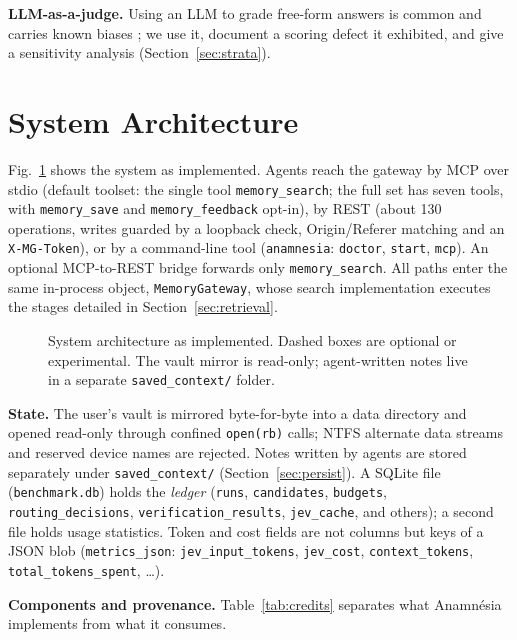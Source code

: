 \documentclass[conference,onecolumn,11pt]{IEEEtran}
\newcommand{\anam}{Anam\-n\'esia}
\begin{document}
\textbf{LLM-as-a-judge.} Using an LLM to grade free-form answers is common and carries known biases \cite{zheng2023judge}; we use it, document a scoring defect it exhibited, and give a sensitivity analysis (Section~\ref{sec:strata}).

\section{System Architecture}\label{sec:arch}
Fig.~\ref{fig:arch} shows the system as implemented. Agents reach the gateway by MCP over stdio (default toolset: the single tool \texttt{memory\_search}; the full set has seven tools, with \texttt{memory\_save} and \texttt{memory\_feedback} opt-in), by REST (about 130 operations, writes guarded by a loopback check, Origin/Referer matching and an \texttt{X-MG-Token}), or by a command-line tool (\texttt{anamnesia}: \texttt{doctor}, \texttt{start}, \texttt{mcp}). An optional MCP-to-REST bridge forwards only \texttt{memory\_search}. All paths enter the same in-process object, \texttt{MemoryGateway}, whose search implementation executes the stages detailed in Section~\ref{sec:retrieval}.

\begin{figure}[!htbp]\centering
{}
\caption{System architecture as implemented. Dashed boxes are optional or experimental. The vault mirror is read-only; agent-written notes live in a separate \texttt{saved\_context/} folder.}\label{fig:arch}
\end{figure}

\textbf{State.} The user's vault is mirrored byte-for-byte into a data directory and opened read-only through confined \texttt{open(rb)} calls; NTFS alternate data streams and reserved device names are rejected. Notes written by agents are stored separately under \texttt{saved\_context/} (Section~\ref{sec:persist}). A SQLite file (\texttt{benchmark.db}) holds the \emph{ledger} (\texttt{runs}, \texttt{candidates}, \texttt{budgets}, \texttt{routing\_decisions}, \texttt{verification\_results}, \texttt{jev\_cache}, and others); a second file holds usage statistics. Token and cost fields are not columns but keys of a JSON blob (\texttt{metrics\_json}: \texttt{jev\_input\_tokens}, \texttt{jev\_cost}, \texttt{context\_tokens}, \texttt{total\_tokens\_spent}, \dots).

\textbf{Components and provenance.} Table~\ref{tab:credits} separates what \anam{} implements from what it consumes.
\end{document}
